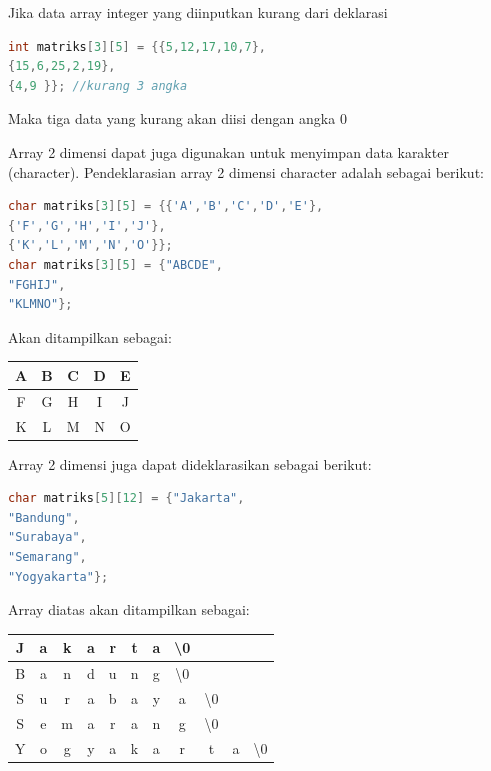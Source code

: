 Jika data array integer yang diinputkan kurang dari deklarasi

\begin{lstlisting}[language=c++, numbers=none]
int matriks[3][5] = {{5,12,17,10,7},
{15,6,25,2,19},
{4,9 }}; //kurang 3 angka
\end{lstlisting}

Maka tiga data yang kurang akan diisi dengan angka 0

Array 2 dimensi dapat juga digunakan untuk menyimpan data karakter
(character). Pendeklarasian array 2 dimensi character adalah sebagai
berikut:

\begin{lstlisting}[language=c++, numbers=none]
char matriks[3][5] = {{'A','B','C','D','E'},
{'F','G','H','I','J'},
{'K','L','M','N','O'}};
char matriks[3][5] = {"ABCDE",
"FGHIJ",
"KLMNO"};
\end{lstlisting}

Akan ditampilkan sebagai:

\begin{tabular}{|c|c|c|c|c|}
\hline
A &B &C& D& E \\ \hline
F &G &H &I& J \\ \hline
K &L &M& N& O \\ \hline

\end{tabular}

Array 2 dimensi juga dapat dideklarasikan sebagai berikut:

\begin{lstlisting}[language=c++, numbers=none]
char matriks[5][12] = {"Jakarta",
"Bandung",
"Surabaya",
"Semarang",
"Yogyakarta"};
\end{lstlisting}

Array diatas akan ditampilkan sebagai:

\begin{tabular}{|c|c|c|c|c|c|c|c|c|c|c|}
\hline
J & a & k & a & r & t & a & \textbackslash{0} & & & \\ \hline
B & a & n & d & u & n & g & \textbackslash{0} & & & \\ \hline
S & u & r & a & b & a & y & a &\textbackslash{0}  & &\\ \hline
S & e & m & a & r & a & n & g & \textbackslash{0} & & \\ \hline
Y & o & g & y & a & k & a & r & t & a &   \textbackslash{0} \\ \hline

\end{tabular}



